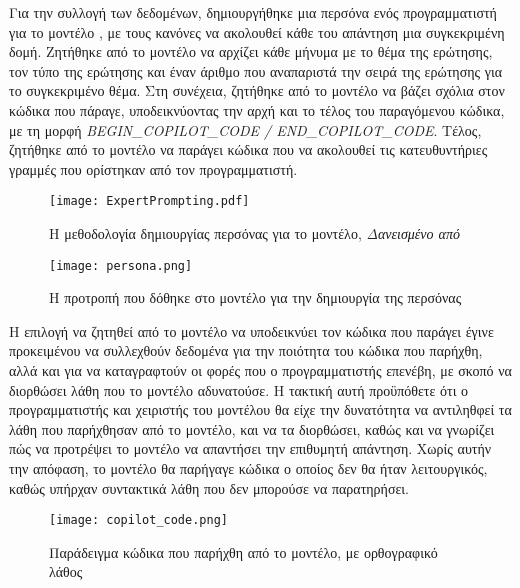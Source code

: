   Για την συλλογή των δεδομένων, δημιουργήθηκε μια περσόνα ενός
  προγραμματιστή για το μοντέλο \cite{zhou2024sotopia,AitBaha2023,
  xu2023expertprompting}, με τους κανόνες να ακολουθεί κάθε του απάντηση
  μια συγκεκριμένη δομή. Ζητήθηκε από το μοντέλο να αρχίζει κάθε μήνυμα με
  το θέμα της ερώτησης, τον τύπο της ερώτησης και έναν άριθμο που
  αναπαριστά την σειρά της ερώτησης για το συγκεκριμένο θέμα. Στη
  συνέχεια, ζητήθηκε από το μοντέλο να βάζει σχόλια στον κώδικα που
  πάραγε, υποδεικνύοντας την αρχή και το τέλος του παραγόμενου κώδικα, με
  τη μορφή \textlatin{\textit{BEGIN\_COPILOT\_CODE / END\_COPILOT\_CODE}}.
  Τέλος, ζητήθηκε από το μοντέλο να παράγει κώδικα που να ακολουθεί τις
  κατευθυντήριες γραμμές που ορίστηκαν από τον προγραμματιστή.

  \begin{figure}[H]
    \begin{center}
      \texttt{[image: ExpertPrompting.pdf]}
      \caption{Η μεθοδολογία δημιουργίας περσόνας για το μοντέλο,
      \textit{Δανεισμένο από \cite{xu2023expertprompting}} }
    \end{center}
    \label{fig:ExpertPrompting}
  \end{figure}

  \begin{figure}[H]
    \begin{center}
      \texttt{[image: persona.png]}
      \caption{Η προτροπή που δόθηκε στο μοντέλο για την δημιουργία της
      περσόνας}
    \end{center}
    \label{fig:persona}
  \end{figure}

  Η επιλογή να ζητηθεί από το μοντέλο να υποδεικνύει τον κώδικα που
  παράγει έγινε προκειμένου να συλλεχθούν δεδομένα για την ποιότητα του
  κώδικα που παρήχθη, αλλά και για να καταγραφτούν οι φορές που ο
  προγραμματιστής επενέβη, με σκοπό να διορθώσει λάθη που το μοντέλο
  αδυνατούσε. Η τακτική αυτή προϋπόθετε ότι ο προγραμματιστής και
  χειριστής του μοντέλου θα είχε την δυνατότητα να αντιληθφεί τα λάθη που
  παρήχθησαν από το μοντέλο, και να τα διορθώσει, καθώς και να γνωρίζει
  πώς να προτρέψει το μοντέλο να απαντήσει την επιθυμητή απάντηση. Χωρίς
  αυτήν την απόφαση, το μοντέλο θα παρήγαγε κώδικα ο οποίος δεν θα ήταν
  λειτουργικός, καθώς υπήρχαν συντακτικά λάθη που δεν μπορούσε να
  παρατηρήσει.

  \begin{figure}[H]
    \begin{center}
      \texttt{[image: copilot\_code.png]}
      \caption{Παράδειγμα κώδικα που παρήχθη από το μοντέλο, με
      ορθογραφικό λάθος}
    \end{center}
    \label{fig:copilotCode}
  \end{figure}

